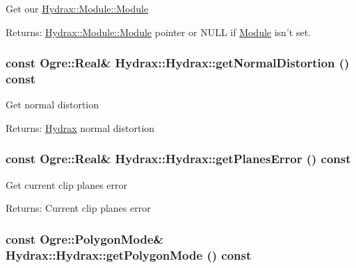 Get our \hyperlink{class_hydrax_1_1_module_1_1_module}{Hydrax::Module::Module} \begin{Desc}
\item[Returns:]\hyperlink{class_hydrax_1_1_module_1_1_module}{Hydrax::Module::Module} pointer or NULL if \hyperlink{namespace_hydrax_1_1_module}{Module} isn't set. \end{Desc}
\hypertarget{class_hydrax_1_1_hydrax_129ecf4478ecca15299d9f25e9074b90}{
\subsubsection[{getNormalDistortion}]{\setlength{\rightskip}{0pt plus 5cm}const Ogre::Real\& Hydrax::Hydrax::getNormalDistortion () const}}
\label{class_hydrax_1_1_hydrax_129ecf4478ecca15299d9f25e9074b90}


Get normal distortion \begin{Desc}
\item[Returns:]\hyperlink{class_hydrax_1_1_hydrax}{Hydrax} normal distortion \end{Desc}
\hypertarget{class_hydrax_1_1_hydrax_99b530dca1b0ba95e43d4deeec01d7d1}{
\subsubsection[{getPlanesError}]{\setlength{\rightskip}{0pt plus 5cm}const Ogre::Real\& Hydrax::Hydrax::getPlanesError () const}}
\label{class_hydrax_1_1_hydrax_99b530dca1b0ba95e43d4deeec01d7d1}


Get current clip planes error \begin{Desc}
\item[Returns:]Current clip planes error \end{Desc}
\hypertarget{class_hydrax_1_1_hydrax_f31388148136dfdd563388e3f4ae4b59}{
\subsubsection[{getPolygonMode}]{\setlength{\rightskip}{0pt plus 5cm}const Ogre::PolygonMode\& Hydrax::Hydrax::getPolygonMode () const}}
\label{class_hydrax_1_1_hydrax_f31388148136dfdd563388e3f4ae4b59}


